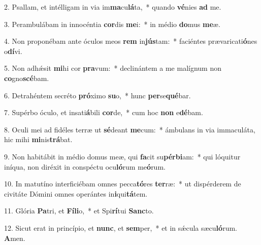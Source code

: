 2. Psallam, et intélligam in via im\textbf{ma}cu\textbf{lá}ta,~*  quando \textbf{vé}nies \textbf{ad} me.\

3. Perambulábam in innocéntia \textbf{cor}dis \textbf{me}i:~*  in médio \textbf{do}mus \textbf{me}æ.\

4. Non proponébam ante óculos meos \textbf{rem} in\textbf{jús}tam:~*  faciéntes prævaricati\textbf{ó}nes o\textbf{dí}vi.\

5. Non adhǽsit \textbf{mi}hi cor \textbf{pra}vum:~*  declinántem a me malígnum non \textbf{co}gno\textbf{scé}bam.\

6. Detrahéntem secréto \textbf{pró}ximo \textbf{su}o,~*  hunc \textbf{per}se\textbf{qué}bar.\

7. Supérbo óculo, et insati\textbf{á}bili \textbf{cor}de,~*  cum hoc \textbf{non} e\textbf{dé}bam.\

8. Oculi mei ad fidéles terræ ut \textbf{sé}deant \textbf{me}cum:~*  ámbulans in via immaculáta, hic mihi \textbf{mi}nis\textbf{trá}bat.\

9. Non habitábit in médio domus meæ, qui \textbf{fa}cit su\textbf{pér}\textbf{bi}am:~*  qui lóquitur iníqua, non diréxit in conspéctu ocu\textbf{ló}rum me\textbf{ó}rum.\

10. In matutíno interficiébam omnes pecca\textbf{tó}res \textbf{ter}ræ:~*  ut dispérderem de civitáte Dómini omnes operántes in\textbf{i}qui\textbf{tá}tem.\

11. Glória \textbf{Pa}tri, et \textbf{Fí}\textbf{li}o,~*  et Spi\textbf{rí}tui \textbf{Sanc}to.\

12. Sicut erat in princípio, et \textbf{nunc}, et \textbf{sem}per,~*  et in sǽcula sæcu\textbf{ló}rum. \textbf{A}men.\

